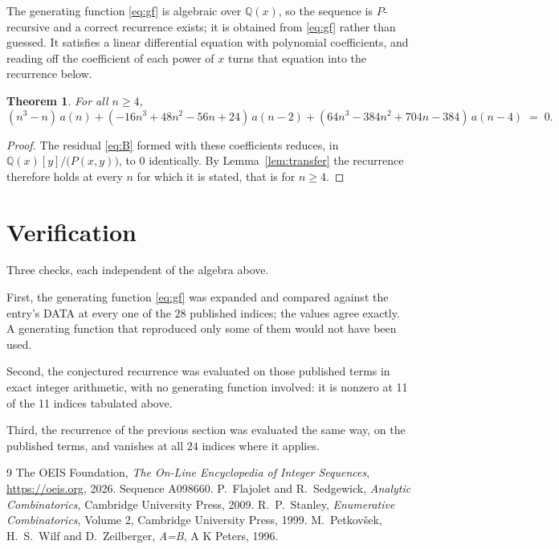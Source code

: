 \documentclass[11pt,a4paper]{article}
\theoremstyle{plain}
\newtheorem{theorem}{Theorem}
\theoremstyle{definition}
\begin{document}
The generating function \eqref{eq:gf} is algebraic over $\mathbb{Q}(x)$, so the sequence is $P$-recursive and
a correct recurrence exists; it is obtained from \eqref{eq:gf} rather than guessed.
It satisfies a linear differential equation with polynomial coefficients, and reading off the coefficient of each power of $x$ turns that equation into the recurrence below.

\begin{theorem}
For all $n\ge4$,
\[
\left(n^{3} - n\right)\,a(n) + \left(- 16 n^{3} + 48 n^{2} - 56 n + 24\right)\,a(n-2) + \left(64 n^{3} - 384 n^{2} + 704 n - 384\right)\,a(n-4)\;=\;0 .
\]
\end{theorem}

\begin{proof}
The residual \eqref{eq:B} formed with these coefficients reduces, in $\mathbb{Q}(x)[y]/\bigl(P(x,y)\bigr)$, to $0$ identically. By Lemma~\ref{lem:transfer} the recurrence therefore holds at every $n$ for which it is stated, that is for $n\ge4$.
\end{proof}

\section{Verification}

Three checks, each independent of the algebra above.

First, the generating function \eqref{eq:gf} was expanded and compared against the entry's
DATA at every one of the $28$ published indices; the values agree exactly. A
generating function that reproduced only some of them would not have been used.

Second, the conjectured recurrence was evaluated on those published terms in exact integer
arithmetic, with no generating function involved: it is nonzero at 11 of the 11 indices tabulated above.

Third, the recurrence of the previous section was evaluated the same way, on the published
terms, and vanishes at all $24$ indices where it applies.

\begin{thebibliography}{9}
 The OEIS Foundation, \emph{The On-Line Encyclopedia of Integer Sequences},
\url{https://oeis.org}, 2026. Sequence A098660.
 P.~Flajolet and R.~Sedgewick, \emph{Analytic Combinatorics}, Cambridge
University Press, 2009.
 R.~P.~Stanley, \emph{Enumerative Combinatorics}, Volume 2, Cambridge
University Press, 1999.
 M.~Petkov\v{s}ek, H.~S.~Wilf and D.~Zeilberger, \emph{A=B}, A K Peters,
1996.
\end{thebibliography}
\end{document}
